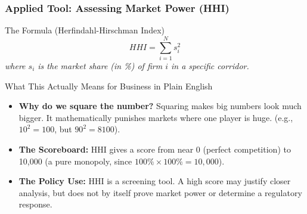 \documentclass{beamer}
\begin{document}
\begin{frame}[t, shrink=10]
  \frametitle{Applied Tool: Assessing Market Power (HHI)}
  
  \begin{block}{The Formula (Herfindahl-Hirschman Index)}
  \begin{equation}
      HHI = \sum_{i=1}^{N} s_i^2
  \end{equation}
  \textit{where $s_i$ is the market share (in \%) of firm $i$ in a specific corridor.}
  \end{block}

  \vspace{0.1cm}
  \begin{block}{What This Actually Means for Business in Plain English}
  \begin{itemize}
    \item \textbf{Why do we square the number?} Squaring makes big numbers look much bigger. It mathematically punishes markets where one player is huge. (e.g., $10^2 = 100$, but $90^2 = 8100$).
    \item \textbf{The Scoreboard:} HHI gives a score from near 0 (perfect competition) to 10,000 (a pure monopoly, since $100\% \times 100\% = 10,000$).
    \item \textbf{The Policy Use:} HHI is a screening tool. A high score may justify closer analysis, but does not by itself prove market power or determine a regulatory response.
  \end{itemize}
  \end{block}
\end{frame}
\end{document}
